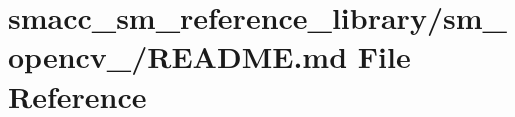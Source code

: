 \hypertarget{smacc__sm__reference__library_2sm__opencv__3_2README_8md}{}\section{smacc\+\_\+sm\+\_\+reference\+\_\+library/sm\+\_\+opencv\+\_/\+R\+E\+A\+D\+ME.md File Reference}
\label{smacc__sm__reference__library_2sm__opencv__3_2README_8md}
